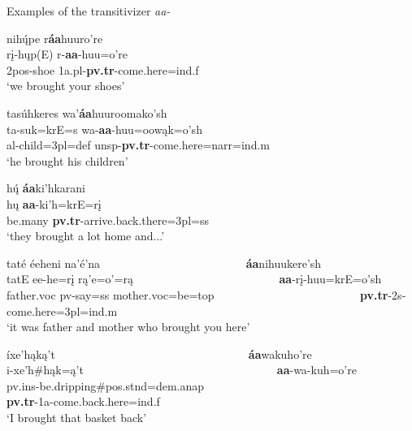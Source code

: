 \begin{exe}

\item\label{TransitivePreverb} Examples of the transitivizer \textit{aa-}

\begin{xlist}

\item \glll nihų́pe r\textbf{áa}huuro're\\
	rį-hųp(E) r-\textbf{aa}-huu=o're\\
	2pos-\textnormal{shoe} 1a.pl-\textbf{pv.tr}-\textnormal{come.here}=ind.f\\
	\glt 	`we brought your shoes' \citep[169]{hollow1973a}
	
\item \glll tasúhkeres wa'\textbf{áa}huuroomako'sh\\
	ta-suk=krE=s wa-\textbf{aa}-huu=oowąk=o'sh\\
	al-\textnormal{child}=3pl=def unsp-\textbf{pv.tr}-\textnormal{come.here}=narr=ind.m\\
	\glt `he brought his children' \citep[177]{hollow1973a}
	
\item \glll hų́ \textbf{áa}ki'hkarani\\
	hų \textbf{aa}-ki'h=krE=rį\\
	\textnormal{be.many} \textbf{pv.tr}-\textnormal{arrive.back.there}=3pl=ss\\
	\glt 	`they brought a lot home and...' \citep[184]{hollow1973a}
	
\item \glll taté éeheni na'é'na ~ ~ ~ ~ ~ ~ ~ ~ ~ ~ ~ ~ ~ ~ ~  \textbf{áa}nihuukere'sh\\
	tatE ee-he=rį rą'e=o'=rą ~ ~ ~ ~ ~ ~ ~ ~ ~ ~ ~ ~ ~ ~ ~  \textbf{aa}-rį-huu=krE=o'sh\\
	\textnormal{father}.voc pv-\textnormal{say}=ss \textnormal{mother}.voc=\textnormal{be}=top ~ ~ ~ ~ ~ ~ ~ ~ ~ ~ ~ ~ ~ ~ ~  \textbf{pv.tr}-2s-\textnormal{come.here}=3pl=ind.m\\
	\glt `it was father and mother who brought you here' \citep[211]{hollow1973a}
	
\item \glll íxe'hąką't ~ ~ ~ ~ ~ ~ ~ ~ ~ ~ ~ ~ ~ ~ ~ ~ ~ ~ ~ ~  \textbf{áa}wakuho're\\
	i-xe'h\#hąk=ą't ~ ~ ~ ~ ~ ~ ~ ~ ~ ~ ~ ~ ~ ~ ~ ~ ~ ~ ~ ~  \textbf{aa}-wa-kuh=o're\\
	pv.ins-\textnormal{be.dripping}\#pos.stnd=dem.anap ~ ~ ~ ~ ~ ~ ~ ~ ~ ~ ~ ~ ~ ~ ~ ~ ~ ~ ~ ~ \textbf{pv.tr}-1a-\textnormal{come.back.here}=ind.f\\
	\glt `I brought that basket back' \citep[92]{hollow1973a}
	

\end{xlist}
\end{exe}
